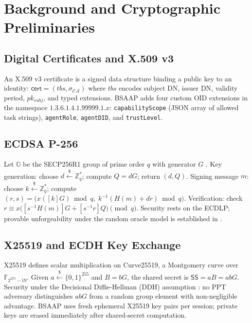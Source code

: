 \documentclass[review,5p,twocolumn,times]{elsarticle}
\begin{document}
\section{Background and Cryptographic Preliminaries}\label{sec:background}

\subsection{Digital Certificates and X.509 v3}

An X.509 v3 certificate \cite{rfc5280} is a signed data structure binding a
public key to an identity: $\mathsf{cert} = (\mathit{tbs}, \sigma_{\mathcal{CA}})$
where $\mathit{tbs}$ encodes subject DN, issuer DN, validity period,
$pk_{\mathit{subj}}$, and typed extensions.
BSAAP adds four custom OID extensions in the namespace
$1.3.6.1.4.1.99999.1.x$: \texttt{capabilityScope} (JSON array of allowed
task strings), \texttt{agentRole}, \texttt{agentDID}, and \texttt{trustLevel}.

\subsection{ECDSA P-256}

Let $\mathbb{G}$ be the SECP256R1 group of prime order $q$ with generator $G$
\cite{nistfips186}. Key generation: choose $d \xleftarrow{\$} \mathbb{Z}_q^*$;
compute $Q = dG$; return $(d, Q)$.
Signing message $m$: choose $k \xleftarrow{\$} \mathbb{Z}_q^*$;
compute $(r, s) = \bigl(x([k]G) \bmod q,\; k^{-1}(H(m)+dr) \bmod q\bigr)$.
Verification: check $r \equiv x\bigl([s^{-1}H(m)]G + [s^{-1}r]Q\bigr) \pmod{q}$.
Security rests on the ECDLP; provable unforgeability under the random oracle
model is established in \cite{fersch2016provable}.

\subsection{X25519 and ECDH Key Exchange}

X25519 \cite{rfc7748,bernstein2006curve25519} defines scalar multiplication on
Curve25519, a Montgomery curve over $\mathbb{F}_{2^{255}-19}$.
Given $a \xleftarrow{\$} \{0,1\}^{255}$ and $B = bG$, the shared secret is
$\mathsf{SS} = aB = abG$.
Security under the Decisional Diffie-Hellman (DDH) assumption \cite{diffie1976new}: no PPT
adversary distinguishes $abG$ from a random group element with non-negligible
advantage. BSAAP uses fresh ephemeral X25519 key pairs per session; private
keys are erased immediately after shared-secret computation.
\end{document}
